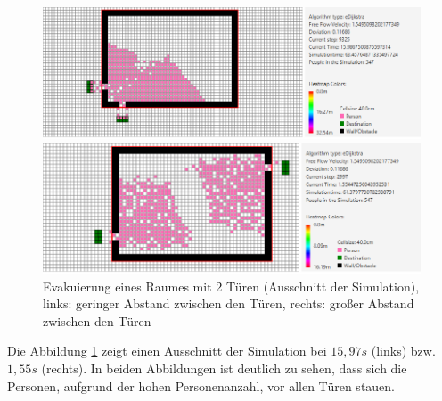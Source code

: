 \begin{figure}[!htb]
	\centering
	\begin{minipage}{.5\textwidth}
		\centering
		\includegraphics[width=\textwidth]{abbildungen/Evak2TMinDis2MITTE.png}
	\end{minipage}%
	\begin{minipage}{0.5\textwidth}
		\centering
		\includegraphics[width=\textwidth]{abbildungen/Evak2TMaxDis2MITTE.png}
	\end{minipage}
	\caption{Evakuierung eines Raumes mit 2 Türen (Ausschnitt der Simulation), links: geringer Abstand zwischen den Türen, rechts: großer Abstand zwischen den Türen}
	\label{fig:Evak2TminmaxDis2MITE}
\end{figure}

Die Abbildung \ref{fig:Evak2TminmaxDis2MITE} zeigt einen Ausschnitt der Simulation bei $15,97s$ (links) bzw. $1,55s$ (rechts). In beiden Abbildungen ist deutlich zu sehen, dass sich die Personen, aufgrund der hohen Personenanzahl, vor allen Türen stauen.

